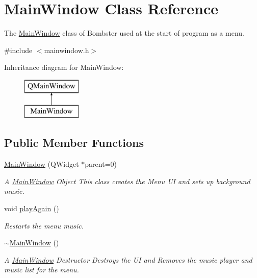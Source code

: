 \hypertarget{class_main_window}{\section{Main\-Window Class Reference}
\label{class_main_window}
}


The \hyperlink{class_main_window}{Main\-Window} class of Bombster used at the start of program as a menu.  




{\ttfamily \#include $<$mainwindow.\-h$>$}

Inheritance diagram for Main\-Window\-:\begin{figure}[H]
\begin{center}
\leavevmode
\includegraphics[height=2.000000cm]{class_main_window}
\end{center}
\end{figure}
\subsection*{Public Member Functions}
\begin{DoxyCompactItemize}
\item 
\hyperlink{class_main_window_a8b244be8b7b7db1b08de2a2acb9409db}{Main\-Window} (Q\-Widget $\ast$parent=0)
\begin{DoxyCompactList}\small\item\em A \hyperlink{class_main_window}{Main\-Window} Object This class creates the Menu U\-I and sets up background music. \end{DoxyCompactList}\item 
void \hyperlink{class_main_window_ab622d7f3b4082b8221185e216991e602}{play\-Again} ()
\begin{DoxyCompactList}\small\item\em Restarts the menu music. \end{DoxyCompactList}\item 
\hyperlink{class_main_window_ae98d00a93bc118200eeef9f9bba1dba7}{$\sim$\-Main\-Window} ()
\begin{DoxyCompactList}\small\item\em A \hyperlink{class_main_window}{Main\-Window} Destructor Destroys the U\-I and Removes the music player and music list for the menu. \end{DoxyCompactList}\end{DoxyCompactItemize}
